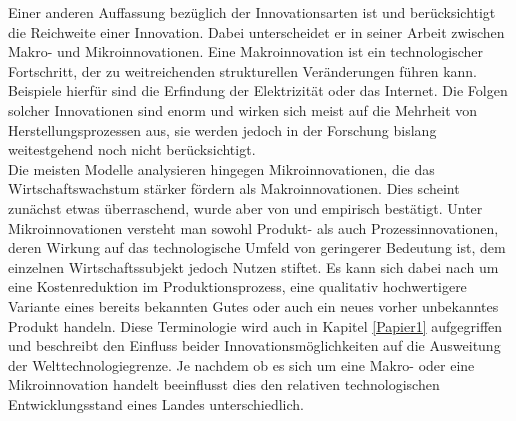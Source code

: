 %
Einer anderen Auffassung bezüglich der Innovationsarten ist \cite{Mokyr.1990} und berücksichtigt die Reichweite einer Innovation. Dabei unterscheidet er in seiner Arbeit zwischen Makro- und Mikroinnovationen. Eine Makroinnovation ist ein technologischer Fortschritt, der zu weitreichenden strukturellen Veränderungen führen kann. Beispiele hierfür sind die Erfindung der Elektrizität oder das Internet. Die Folgen solcher Innovationen sind enorm und wirken sich meist auf die Mehrheit von Herstellungsprozessen aus, sie werden jedoch in der Forschung bislang weitestgehend noch nicht berücksichtigt.\\
%
Die meisten Modelle analysieren hingegen Mikroinnovationen, die das Wirtschaftswachstum stärker fördern als Makroinnovationen. Dies scheint zunächst etwas überraschend, wurde aber von \cite{Abernathy.1978} und \cite{Freeman.1982} empirisch bestätigt. Unter Mikroinnovationen versteht man sowohl Produkt- als auch Prozessinnovationen, deren Wirkung auf das technologische Umfeld von geringerer Bedeutung ist, dem einzelnen Wirtschaftssubjekt jedoch Nutzen stiftet. Es kann sich dabei nach \cite{Mokyr.1990} um eine Kostenreduktion im Produktionsprozess, eine qualitativ hochwertigere Variante eines bereits bekannten Gutes oder auch ein neues vorher unbekanntes Produkt handeln. Diese Terminologie wird auch in Kapitel \ref{Papier1} aufgegriffen und beschreibt den Einfluss beider Innovationsmöglichkeiten auf die Ausweitung der Welttechnologiegrenze. Je nachdem ob es sich um eine Makro- oder eine Mikroinnovation handelt beeinflusst dies den relativen technologischen Entwicklungsstand eines Landes unterschiedlich.
%
